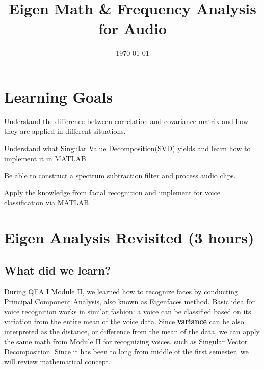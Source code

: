 \documentclass{tufte-handout}
\title{Eigen Math \& Frequency Analysis for Audio}
\author{}
\date{\today}
\begin{document}
\maketitle

\vspace{0.1in}

\section{Learning Goals}

\begin{description}[font=$\bullet$\scshape\bfseries]

\item[]Understand the difference between correlation and covariance matrix and how they are applied in different situations. 

\item[]Understand what Singular Value Decomposition(SVD) yields and learn how to implement it in MATLAB.

\item[]Be able to construct a spectrum subtraction filter and process audio clips.

\item[]Apply the knowledge from facial recognition and implement for voice classification via MATLAB.

\end{description}



\section{Eigen Analysis Revisited (3 hours)}

\subsection{What did we learn?}
During QEA I Module II, we learned how to recognize faces by conducting Principal Component Analysis, also known as Eigenfaces method. Basic idea for voice recognition works in similar fashion: a voice can be classified based on its variation from the entire mean of the voice data. Since \textbf{variance} can be also interpreted as the distance, or difference from the mean of the data, we can apply the same math from Module II for recognizing voices, such as Singular Vector Decomposition. Since it has been to long from middle of the first semester, we will review mathematical concept. 
\end{document}
